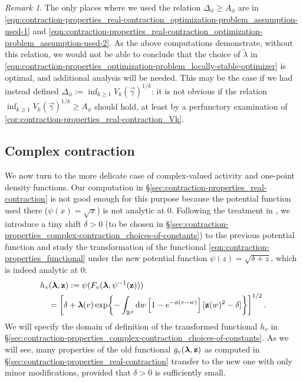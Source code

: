 \documentclass[11pt]{article}
\newcommand{\R}{\mathbb R}
\newcommand{\bl}{\bm{\lambda}}
\newcommand{\pwcc}{\Delta_{\phi}}
\newcommand{\bz}{\vb{z}}
\newcommand{\tl}{\tilde{\lambda}}
\newcommand{\aconst}{A_{\phi}}
\numberwithin{equation}{section}
\theoremstyle{plain}
\theoremstyle{definition}
\theoremstyle{remark}
\newtheorem{remark}[theorem]{Remark}
\begin{document}
\begin{remark}
\label{rmk:contraction-properties_real-contraction_optimization-problem}
The only places where we used the relation $\pwcc\ge\aconst$ are in \eqref{eqn:contraction-properties_real-contraction_optimization-problem_assumption-used-1} and \eqref{eqn:contraction-properties_real-contraction_optimization-problem_assumption-used-2}.
As the above computations demonstrate, without this relation, we would not be able to conclude that the choice of $\tl$ in \eqref{eqn:contraction-properties_optimization-problem_locally-stable-optimizer} is optimal, and additional analysis will be needed.
This may be the case if we had instead defined $\pwcc:=\inf_{k\ge 1} V_{k}(\vec{\gamma})^{1/k}$: it is not obvious if the relation $\inf_{k\ge 1} V_{k}(\vec{\gamma})^{1/k}\ge\aconst$ should hold, at least by a perfunctory examination of \eqref{cor:contraction-properties_real-contraction_Vk}.
\end{remark}



\subsection{Complex contraction}

We now turn to the more delicate case of complex-valued activity and one-point density functions.
Our computation in \S\ref{sec:contraction-properties_real-contraction} is not good enough for this purpose because the potential function used there ($\psi(x)=\sqrt{x}$) is not analytic at $0$.
Following the treatment in \cite[\S A.2]{michelen2023analyticity}, we introduce a tiny shift $\delta>0$ (to be chosen in \S\ref{sec:contraction-properties_complex-contraction_choices-of-constants}) to the previous potential function and study the transformation of the functional \eqref{eqn:contraction-properties_functional} under the new potential function $\psi(z)=\sqrt{\delta+z}$, which is indeed analytic at $0$:
\begin{equation}
\begin{multlined}
h_{v}(\bl,\bz)
:=\psi(F_{v}(\bl,\psi^{-1}(\bz)))
\\
=\left[\delta+\bl(v)\exp{-\int_{\R^{d}}\dd{w}\left[1-e^{-\phi(v-w)}\right][\bz(w)^{2}-\delta]}\right]^{1/2}.
\end{multlined}
\end{equation}
We will specify the domain of definition of the transformed functional $h_{v}$ in \S\ref{sec:contraction-properties_complex-contraction_choices-of-constants}.
As we will see, many properties of the old functional $g_{v}(\bl,\bz)$ as computed in \S\ref{sec:contraction-properties_real-contraction} transfer to the new one with only minor modifications, provided that $\delta>0$ is sufficiently small.
\end{document}
